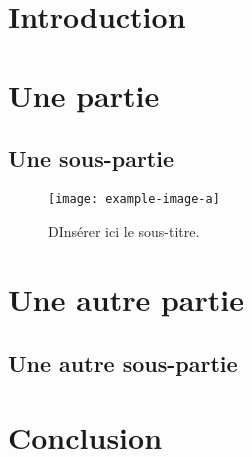 \documentclass[a4paper,12pt,french]{article}
\begin{document}
\thispagestyle{empty}
\tableofcontents


\section{Introduction}


\newpage
\section{Une partie}

\subsection{Une sous-partie}

\lipsum[1]

\begin{figure}[ht!]
    \centering
    \texttt{[image: example-image-a]}
    \caption{DInsérer ici le sous-titre.}
    \label{fig:id}

\end{figure}




\section{Une autre partie}

\subsection{Une autre sous-partie}
\lipsum[2]


\section{Conclusion}




\newpage
\thispagestyle{empty}
\end{document}
